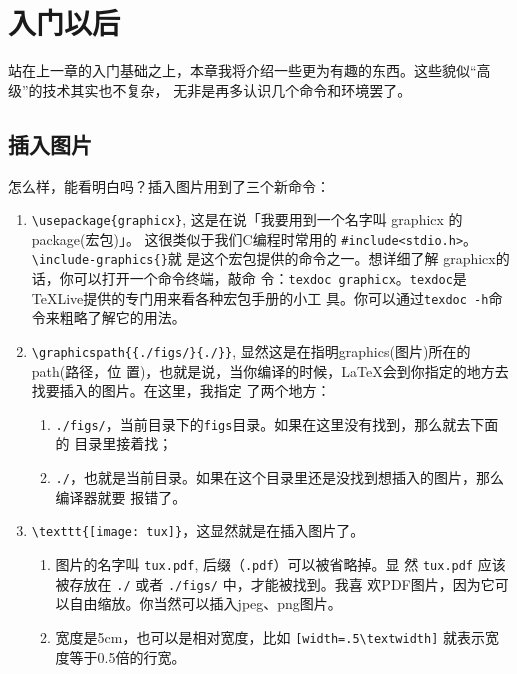 \chapter{入门以后}

站在上一章的入门基础之上，本章我将介绍一些更为有趣的东西。这些貌似“高级”的技术其实也不复杂，
无非是再多认识几个命令和环境罢了。

\section{插入图片}

\begin{codeblock}[.9]
\end{codeblock}

怎么样，能看明白吗？插入图片用到了三个新命令：

\begin{enumerate}
\item \verb'\usepackage{graphicx}', 这是在说「我要用到一个名字叫 graphicx 的package(宏包)」。
  这很类似于我们C编程时常用的 \verb'#include<stdio.h>'。\texttt{\textbackslash{}include-graphics\{\}}就
  是这个宏包提供的命令之一。想详细了解 graphicx的话，你可以打开一个命令终端，敲命
  令：\texttt{texdoc graphicx}。\texttt{texdoc}是TeXLive提供的专门用来看各种宏包手册的小工
  具。你可以通过\texttt{texdoc -h}命令来粗略了解它的用法。
\item \verb'\graphicspath{{./figs/}{./}}', 显然这是在指明graphics(图片)所在的path(路径，位
  置)，也就是说，当你编译的时候，\LaTeX{}会到你指定的地方去找要插入的图片。在这里，我指定
  了两个地方：
  \begin{enumerate}
  \item \texttt{./figs/}，当前目录下的\texttt{figs}目录。如果在这里没有找到，那么就去下面的
    目录里接着找；
  \item \texttt{./}，也就是当前目录。如果在这个目录里还是没找到想插入的图片，那么编译器就要
    报错了。
  \end{enumerate}
\item \verb'\texttt{[image: tux]}'，这显然就是在插入图片了。
  \begin{enumerate}
  \item 图片的名字叫 \texttt{tux.pdf}, 后缀（\texttt{.pdf}）可以被省略掉。显
    然 \texttt{tux.pdf} 应该被存放在 \texttt{./} 或者 \texttt{./figs/} 中，才能被找到。我喜
    欢PDF图片，因为它可以自由缩放。你当然可以插入jpeg、png图片。
  \item 宽度是5cm，也可以是相对宽度，比如 \verb'[width=.5\textwidth]' 就表示宽度等于0.5倍的行宽。
  \end{enumerate}
\end{enumerate}

